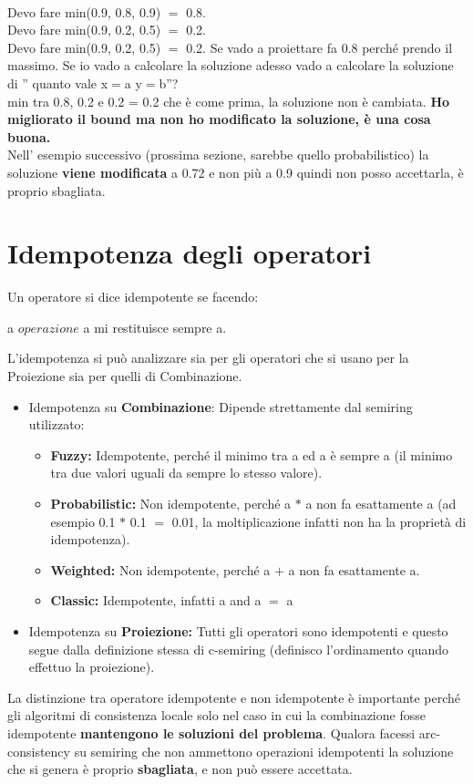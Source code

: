\\Devo fare min(0.9, 0.8, 0.9) $=$ 0.8.
\\Devo fare min(0.9, 0.2, 0.5) $=$ 0.2.
\\Devo fare min(0.9, 0.2, 0.5) $=$ 0.2.
Se vado a proiettare fa 0.8 perché prendo il massimo. Se io vado a calcolare la soluzione adesso vado a calcolare la soluzione di '' quanto vale x$=$a y$=$b''?
\\min tra 0.8, 0.2 e 0.2 = 0.2 che è come prima, la soluzione non è cambiata.
\textbf{Ho migliorato il bound ma non ho modificato la soluzione, è una cosa buona.}
\\Nell' esempio successivo (prossima sezione, sarebbe quello probabilistico) la soluzione \textbf{viene modificata} a 0.72 e non più a 0.9 quindi non posso accettarla, è proprio sbagliata.
\section{Idempotenza degli operatori}
Un operatore si dice idempotente se facendo:
\begin{center}
    a $operazione$ a mi restituisce sempre a.
\end{center}
L'idempotenza si può analizzare sia per gli operatori che si usano per la Proiezione sia per quelli di Combinazione.\\
\begin{itemize}
    \item Idempotenza su \textbf{Combinazione}: Dipende strettamente dal semiring utilizzato:
          \begin{itemize}
              \item \textbf{Fuzzy:} Idempotente, perché il minimo tra a ed a è sempre a (il minimo tra due valori uguali da sempre lo stesso valore).
              \item \textbf{Probabilistic:} Non idempotente, perché a $*$ a non fa esattamente a (ad esempio 0.1 $*$ 0.1 $=$ 0.01, la moltiplicazione infatti non ha la proprietà di idempotenza).
              \item \textbf{Weighted:} Non idempotente, perché a $+$ a non fa esattamente a.
              \item \textbf{Classic:} Idempotente, infatti a and a $=$ a
          \end{itemize}
    \item Idempotenza su \textbf{Proiezione:} Tutti gli operatori sono idempotenti e questo segue dalla definizione stessa di c-semiring (definisco l'ordinamento quando effettuo la proiezione).
\end{itemize}
La distinzione tra operatore idempotente e non idempotente è importante perché gli algoritmi di consistenza locale solo nel caso in cui la combinazione fosse idempotente \textbf{mantengono le soluzioni del problema}. Qualora facessi arc-consistency su semiring che non ammettono operazioni idempotenti la soluzione che si genera è proprio \textbf{sbagliata}, e non può essere accettata.
\vspace{1cm}

